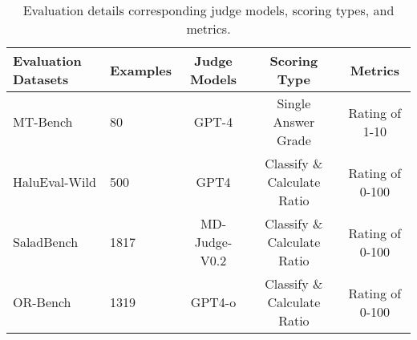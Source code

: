 \begin{table}[ht]
    \centering
    \footnotesize  %
    \setlength{\tabcolsep}{5pt}  %
    \caption{Evaluation details corresponding judge models, scoring types, and metrics.}
    \label{tab:evaluation_comparison}
    \begin{tabular}{@{} l l c c c @{}} %
        \toprule
        \textbf{Evaluation Datasets} &\textbf{Examples} & \textbf{Judge Models} & \textbf{Scoring Type} & \textbf{Metrics} \\
        \midrule
         MT-Bench \cite{zheng2023judging}          & 80    & GPT-4  & Single Answer Grade  & Rating of 1-10 \\
         HaluEval-Wild \cite{zhu2024halueval}         & 500   & GPT4   & Classify \& Calculate Ratio  & Rating of 0-100 \\
         SaladBench \cite{li2024salad}        & 1817  & MD-Judge-V0.2 & Classify \& Calculate Ratio  & Rating of 0-100 \\
         OR-Bench \cite{cui2024or}           & 1319  & GPT4-o & Classify \& Calculate Ratio  & Rating of 0-100 \\
        \bottomrule
    \end{tabular}
\end{table}

